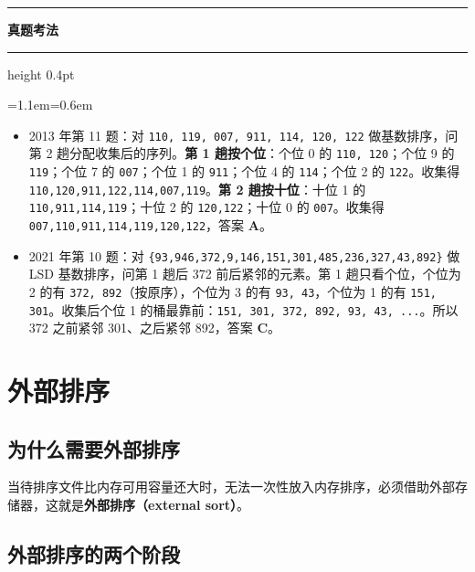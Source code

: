 \documentclass[11pt,openany,UTF8]{ctexbook}
\newcommand{\callouthead}[2]{%
  \par\addvspace{7pt}\noindent
  {\color{#1}\rule[-0.15em]{3pt}{1.05em}}\hspace{0.5em}%
  {\bfseries\color{#1}#2}\par\nobreak\vspace{-0.35em}%
  {\color{rulesep}\hrule height 0.4pt}\nobreak\vspace{0.45em}%
  \begingroup\small\setlength{\parindent}{0pt}%
  \leftskip=1.1em\rightskip=0.6em\noindent\ignorespaces}
\newcommand{\calloutend}{\par\endgroup\addvspace{7pt}}
\newenvironment{callexam}[1]{\callouthead{exambar}{#1}}{\calloutend}
\begin{document}
\begin{callexam}{真题考法}
\begin{itemize}
\item 2013 年第 11 题：对 \texttt{110,\allowbreak{} 119,\allowbreak{} 007,\allowbreak{} 911,\allowbreak{} 114,\allowbreak{} 120,\allowbreak{} 122} 做基数排序，问第 2 趟分配收集后的序列。\textbf{第 1 趟按个位}：个位 0 的 \texttt{110,\allowbreak{} 120}；个位 9 的 \texttt{119}；个位 7 的 \texttt{007}；个位 1 的 \texttt{911}；个位 4 的 \texttt{114}；个位 2 的 \texttt{122}。收集得 \texttt{110,\allowbreak{}120,\allowbreak{}911,\allowbreak{}122,\allowbreak{}114,\allowbreak{}007,\allowbreak{}119}。\textbf{第 2 趟按十位}：十位 1 的 \texttt{110,\allowbreak{}911,\allowbreak{}114,\allowbreak{}119}；十位 2 的 \texttt{120,\allowbreak{}122}；十位 0 的 \texttt{007}。收集得 \texttt{007,\allowbreak{}110,\allowbreak{}911,\allowbreak{}114,\allowbreak{}119,\allowbreak{}120,\allowbreak{}122}，答案 \textbf{A}。
\item 2021 年第 10 题：对 \texttt{\{93,\allowbreak{}946,\allowbreak{}372,\allowbreak{}9,\allowbreak{}146,\allowbreak{}151,\allowbreak{}301,\allowbreak{}485,\allowbreak{}236,\allowbreak{}327,\allowbreak{}43,\allowbreak{}892\}} 做 LSD 基数排序，问第 1 趟后 372 前后紧邻的元素。第 1 趟只看个位，个位为 2 的有 \texttt{372,\allowbreak{} 892}（按原序），个位为 3 的有 \texttt{93,\allowbreak{} 43}，个位为 1 的有 \texttt{151,\allowbreak{} 301}。收集后个位 1 的桶最靠前：\texttt{151,\allowbreak{} 301,\allowbreak{} 372,\allowbreak{} 892,\allowbreak{} 93,\allowbreak{} 43,\allowbreak{} ...}。所以 372 之前紧邻 301、之后紧邻 892，答案 \textbf{C}。
\end{itemize}
\end{callexam}

\section{外部排序}

\subsection{为什么需要外部排序}

当待排序文件比内存可用容量还大时，无法一次性放入内存排序，必须借助外部存储器，这就是\textbf{外部排序（external sort）}。

\subsection{外部排序的两个阶段}
\end{document}
